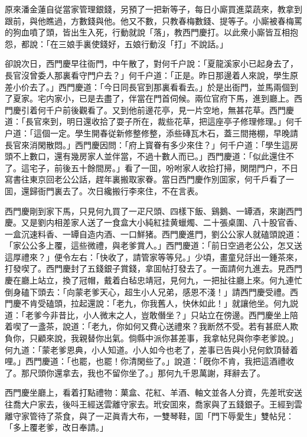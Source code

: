 原來潘金蓮自従當家管理銀錢，另預了一把新等子，每日小廝買進菜蔬來，教拿到跟前，與他瞧過，方數錢與他。他又不數，只教春梅數錢、提等子。小廝被春梅罵的狗血噴了頭，皆出生入死，行動就說「落」，教西門慶打。以此衆小廝皆互相抱怨，都說：「在三娘手裏使錢好，五娘行動沒「打」不說話。」

卻說次日，西門慶早往衙門，中午散了，對何千户說：「夏龍溪家小已起身去了，長官沒曾委人那裏看守門户去？」何千户道：「正是。昨日那邊着人來說，學生原差小价去了。」西門慶道：「今日同長官到那裏看看去。」於是出衙門，並馬兩個到了夏家。宅内家小，已是去盡了，伴當在門首伺候。兩位官府下馬，進到廳上。西門慶引着何千户前後觀看了。又到他前邊花亭，見一片空地，無甚花草。西門慶道：「長官來到，明日還收拾了耍子所在，裁些花草，把這座亭子修理修理。」何千户道：「這個一定。學生開春従新修整修整，添些磚瓦木石，蓋三間捲棚，早晚請長官來消閑散悶。」西門慶因問：「府上寳眷有多少來住？」何千户道：「學生這房頭不上數口，還有幾房家人並伴當，不過十數人而已。」西門慶道：「似此還住不了。這宅子，前後五十餘間房。」看了一囬，吩咐家人收拾打掃，関閉門户，不日寫書往東京回老公公話，趕年裏搬取家眷。當日西門慶作別囬家，何千戶看了一囬，還歸衙門裏去了。次日纔搬行李來住，不在言表。

西門慶剛到家下馬，只見何九買了一疋尺頭、四樣下飯、鷄鵝、一罈酒，來謝西門慶。又是劉内相差家人送了一食盒大小純紅挂黄蠟燭、二十張桌圍、八十股官香、一盒沉速料香、一罈自造内酒、一口鮮猪。西門慶進門，劉公公家人就磕頭說道：「家公公多上覆，這些微禮，與老爹賞人。」西門慶道：「前日空過老公公，怎又送這厚禮來？」便令左右：「快收了，請管家等等兒。」少頃，畫童兒㧱出一鍾茶來，打發喫了。西門慶封了五錢銀子賞錢，拿囬帖打發去了。一面請何九進去。見西門慶在廳上站立，換了冠帽，戴着白毡忠靖冠，見何九，一把扯往廳上來。何九連忙倒身磕下頭去：「向蒙老爹天心，超生小人兄弟，感恩不淺！」請西門慶受禮。西門慶不肯受磕頭，拉起還說：「老九，你我舊人，快休如此！」就讓他坐。何九説道：「老爹今非昔比，小人微末之人，豈敢僭坐？」只站立在傍邊。西門慶坐上陪着喫了一盞茶，說道：「老九，你如何又費心送禮來？我断然不受。若有甚麽人欺負你，只顧來說，我親替你出氣。倘縣中派你甚差事，我拿帖兒與你李老爹說。」何九道：「蒙老爹恩典，小人知道。小人如今也老了，差事已告與小兒何欽頂替着哩。」西門慶道：「也罷，也罷！你清閑些了。」說道：「旣你不肯，我把這酒禮收了。那尺頭你還拿去，我也不留你坐了。」那何九千恩萬謝，拜辭去了。

西門慶坐廳上，看着打點禮物：菓盒、花紅、羊酒、軸文並各人分資，先差玳安送往喬大户家去，後呌王經送雲離守家去。玳安囬來，喬家與了五錢銀子。王經到雲離守家管待了茶食，與了一疋眞青大布，一雙琴鞋，囬「門下辱愛生」雙帖兒：「多上覆老爹，改日奉請。」

